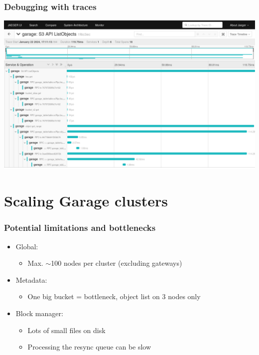 \documentclass[aspectratio=169,xcolor={svgnames}]{beamer}
\begin{document}
\begin{frame}
	\frametitle{Debugging with traces}
	\begin{center}
		\includegraphics[width=.8\linewidth]{../assets/screenshots/jaeger_listobjects.png}
	\end{center}
\end{frame}


\section{Scaling Garage clusters}

\begin{frame}
	\frametitle{Potential limitations and bottlenecks}
	\begin{itemize}
		\item Global:
			\begin{itemize}
				\item Max. $\sim$100 nodes per cluster (excluding gateways)
			\end{itemize}
			\vspace{1em}
		\item Metadata:
			\begin{itemize}
				\item One big bucket = bottleneck, object list on 3 nodes only
			\end{itemize}
			\vspace{1em}
		\item Block manager:
			\begin{itemize}
				\item Lots of small files on disk
				\item Processing the resync queue can be slow
			\end{itemize}
	\end{itemize}
\end{frame}
\end{document}
